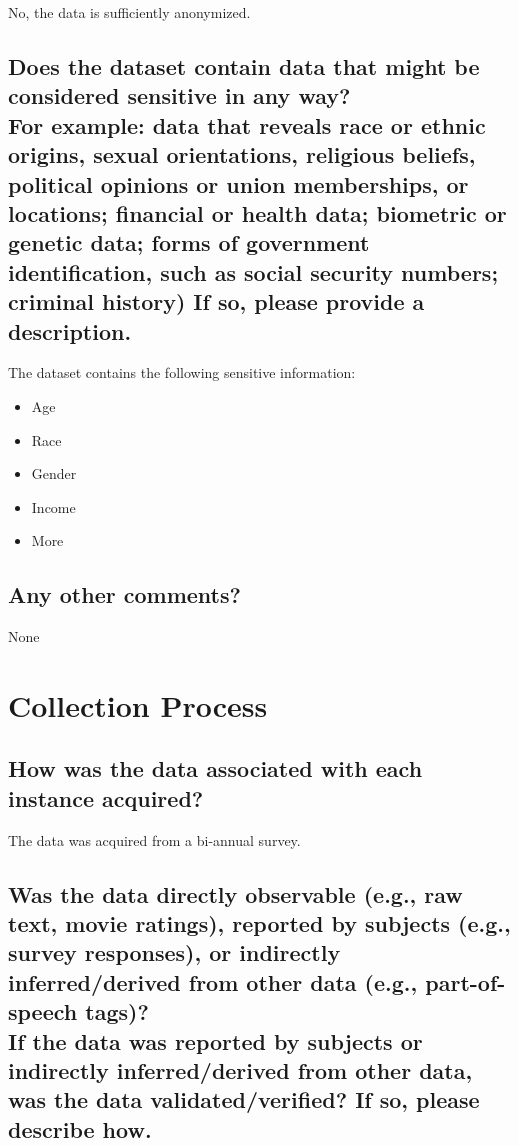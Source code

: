 \documentclass[letterpaper, 10 pt, conference]{ieeeconf}  %
\newcommand{\subtitle}[1]{{\\ \small \normalfont \color{purple} #1}}
\begin{document}
No, the data is sufficiently anonymized.

\subsection{Does the dataset contain data that might be considered sensitive in any way? \subtitle{For example: data that reveals race or ethnic origins, sexual orientations, religious beliefs, political opinions or union memberships, or locations; financial or health data; biometric or genetic data; forms of government identification, such as social security numbers; criminal history) If so, please provide a description.}}

The dataset contains the following sensitive information:

\begin{itemize}
    \item Age
    \item Race
    \item Gender
    \item Income
    \item More
\end{itemize}


\subsection{Any other comments?}

None

\section{Collection Process}

\subsection{How was the data associated with each instance acquired?}

The data was acquired from a bi-annual survey.

\subsection{Was the data directly observable (e.g., raw text, movie ratings), reported by subjects (e.g., survey responses), or indirectly inferred/derived from other data (e.g., part-of-speech tags)? \subtitle{If the data was reported by subjects or indirectly inferred/derived from other data, was the data validated/verified? If so, please describe how.}}
\end{document}
